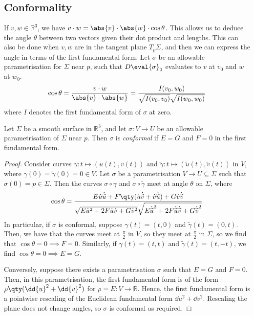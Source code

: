 \subsection{Conformality}
If $v,w \in \mathbb R^3$, we have $v \cdot w = \abs{v} \cdot \abs{w} \cdot \cos\theta$.
This allows us to deduce the angle $\theta$ between two vectors given their dot product and lengths.
This can also be done when $v,w$ are in the tangent plane $T_p \Sigma$, and then we can express the angle in terms of the first fundamental form.
Let $\sigma$ be an allowable parametrisation for $\Sigma$ near $p$, such that $D\eval{\sigma}_0$ evaluates to $v$ at $v_0$ and $w$ at $w_0$.
\begin{align*}
	\cos \theta = \frac{v \cdot w}{\abs{v} \cdot \abs{w}} = \frac{I(v_0, w_0)}{\sqrt{I(v_0,v_0)} \sqrt{I(w_0,w_0)}}
\end{align*}
where $I$ denotes the first fundamental form of $\sigma$ at zero.
\begin{lemma}
	Let $\Sigma$ be a smooth surface in $\mathbb R^3$, and let $\sigma \colon V \to U$ be an allowable parametrisation of $\Sigma$ near $p$.
	Then $\sigma$ is \textit{conformal} if $E = G$ and $F = 0$ in the first fundamental form.
\end{lemma}
\begin{proof}
	Consider curves $\gamma \colon t \mapsto (u(t), v(t))$ and $\widetilde \gamma \colon t \mapsto (\widetilde u(t), \widetilde v(t))$ in $V$, where $\gamma(0) = \widetilde \gamma(0) = 0 \in V$.
	Let $\sigma$ be a parametrisation $V \to U \subseteq \Sigma$ such that $\sigma(0) = p \in \Sigma$.
	Then the curves $\sigma \circ \gamma$ and $\sigma \circ \widetilde \gamma$ meet at angle $\theta$ on $\Sigma$, where
	\begin{align*}
		\cos \theta = \frac{E \dot u \dot {\widetilde u} + F \qty(\dot u \dot{\widetilde v} + \dot v \dot{\widetilde u}) + G \dot v \dot{\widetilde v}}{\sqrt{E \dot u^2 + 2F \dot u \dot v + G \dot v^2} \sqrt{E \dot{\widetilde u}^2 + 2F \dot{\widetilde u} \dot {\widetilde v} + G \dot{\widetilde v}^2}}
	\end{align*}
	In particular, if $\sigma$ is conformal, suppose $\gamma(t) = (t,0)$ and $\widetilde \gamma(t) = (0,t)$.
	Then, we have that the curves meet at $\frac{\pi}{2}$ in $V$, so they meet at $\frac{\pi}{2}$ in $\Sigma$, so we find that $\cos \theta = 0 \implies F = 0$.
	Similarly, if $\gamma(t) = (t,t)$ and $\widetilde \gamma(t) = (t,-t)$, we find $\cos \theta = 0 \implies E = G$.

	Conversely, suppose there exists a parametrisation $\sigma$ such that $E = G$ and $F = 0$.
	Then, in this parametrisation, the first fundamental form is of the form $\rho \qty(\dd{u}^2 + \dd{v}^2)$ for $\rho = E \colon V \to \mathbb R$.
	Hence, the first fundamental form is a pointwise rescaling of the Euclidean fundamental form $\dd{u}^2 + \dd{v}^2$.
	Rescaling the plane does not change angles, so $\sigma$ is conformal as required.
\end{proof}
